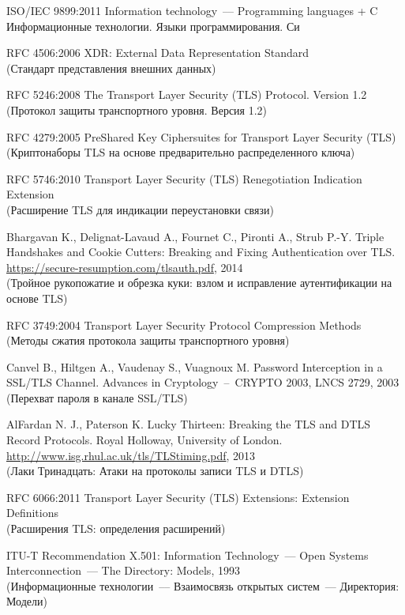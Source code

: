 \begin{thebibliography}{999}
ISO/IEC 9899:2011 
Information technology~--– Programming languages + C\\
{\small Информационные технологии. Языки программирования. Си}

RFC 4506:2006 XDR: 
External Data Representation Standard \\
{\small (Стандарт представления внешних данных)}

RFC 5246:2008 
The Transport Layer Security (TLS) Protocol. Version 1.2 \\
{\small (Протокол защиты транспортного уровня. Версия 1.2)}

RFC 4279:2005 
PreShared Key Ciphersuites for Transport Layer Security (TLS)\\ 
{\small (Криптонаборы TLS на основе предварительно распределенного ключа)}

RFC 5746:2010 
Transport Layer Security (TLS) Renegotiation Indication Extension\\ 
{\small (Расширение TLS для индикации переустановки связи)}

Bhargavan K., Delignat-Lavaud A., Fournet C., Pironti A., Strub P.-Y. 
Triple Handshakes and Cookie Cutters: Breaking and Fixing Authentication over TLS. 
\url{https://secure-resumption.com/tlsauth.pdf}, 2014\\ 
{\small (Тройное рукопожатие и обрезка куки: взлом и исправление аутентификации 
на основе TLS)}

RFC 3749:2004 
Transport Layer Security Protocol Compression Methods\\ 
{\small (Методы сжатия протокола защиты транспортного уровня)}

Canvel B., Hiltgen A., Vaudenay S., Vuagnoux M. 
Password Interception in a SSL/TLS Channel. Advances in 
Cryptology~--~CRYPTO 2003, LNCS 2729, 2003 \\  
{\small (Перехват пароля в канале SSL/TLS)}

AlFardan N. J., Paterson K. Lucky Thirteen: 
Breaking the TLS and DTLS Record Protocols. 
Royal Holloway, University of London. 
\url{http://www.isg.rhul.ac.uk/tls/TLStiming.pdf}, 2013\\  
{\small (Лаки Тринадцать: Атаки на протоколы записи TLS и DTLS)}

RFC 6066:2011 
Transport Layer Security (TLS) Extensions: Extension Definitions \\
{\small (Расширения TLS: определения расширений)}

ITU-T Recommendation X.501: 
Information Technology~--- Open Systems Interconnection~--- 
The Directory: Models, 1993\\ 
{\small (Информационные технологии~--– Взаимосвязь открытых систем~---
Директория: Модели)}

\label{LastBib}
\end{thebibliography}

